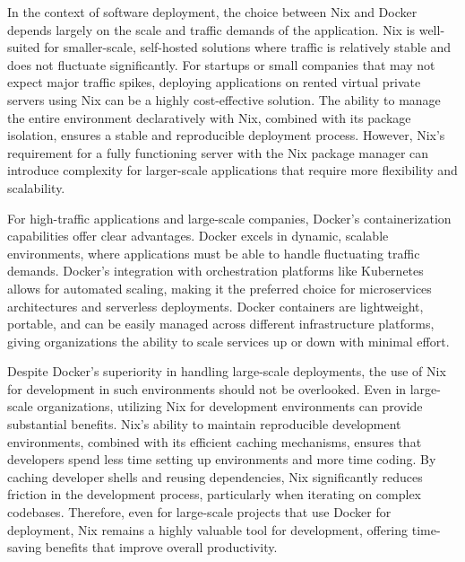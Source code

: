 In the context of software deployment, the choice between Nix and Docker depends largely
on the scale and traffic demands of the application. Nix is well-suited for smaller-scale,
self-hosted solutions where traffic is relatively stable and does not fluctuate significantly.
For startups or small companies that may not expect major traffic spikes, deploying
applications on rented virtual private servers using Nix can be a highly cost-effective
solution. The ability to manage the entire environment declaratively with Nix, combined
with its package isolation, ensures a stable and reproducible deployment process. However,
Nix's requirement for a fully functioning server with the Nix package manager can introduce
complexity for larger-scale applications that require more flexibility and scalability.

For high-traffic applications and large-scale companies, Docker's containerization
capabilities offer clear advantages. Docker excels in dynamic, scalable environments,
where applications must be able to handle fluctuating traffic demands. Docker's
integration with orchestration platforms like Kubernetes allows for automated scaling,
making it the preferred choice for microservices architectures and serverless deployments.
Docker containers are lightweight, portable, and can be easily managed across different
infrastructure platforms, giving organizations the ability to scale services up or down
with minimal effort.

Despite Docker's superiority in handling large-scale deployments, the use of Nix for
development in such environments should not be overlooked. Even in large-scale
organizations, utilizing Nix for development environments can provide substantial
benefits. Nix's ability to maintain reproducible development environments, combined
with its efficient caching mechanisms, ensures that developers spend less time setting
up environments and more time coding. By caching developer shells and reusing
dependencies, Nix significantly reduces friction in the development process, particularly
when iterating on complex codebases. Therefore, even for large-scale projects that use
Docker for deployment, Nix remains a highly valuable tool for development, offering
time-saving benefits that improve overall productivity.

